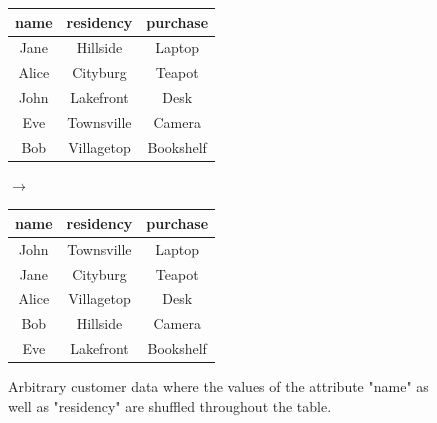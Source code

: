 \bigskip

\begin{figure}[ht]
    \begin{center}
    \footnotesize{
        \renewcommand{\arraystretch}{1.5}
        \begin{tabular}{|c|c|c|}
            \hline
            name & residency & purchase \\
            \hline
            Jane & Hillside & Laptop \\
            \hline
            Alice & Cityburg & Teapot \\
            \hline
            John & Lakefront & Desk \\
            \hline
            Eve & Townsville & Camera \\
            \hline
            Bob & Villagetop & Bookshelf \\
            \hline
        \end{tabular}
        \quad $\longrightarrow$ \quad
        \begin{tabular}{|c|c|c|}
            \hline
            \cellcolor{lightyellow} name & \cellcolor{lightyellow} residency & purchase \\
            \hline
            \cellcolor{lightyellow} John & \cellcolor{lightyellow} Townsville & Laptop \\
            \hline
            \cellcolor{lightyellow} Jane & Cityburg & Teapot \\
            \hline
            \cellcolor{lightyellow} Alice & \cellcolor{lightyellow} Villagetop & Desk \\
            \hline
            \cellcolor{lightyellow} Bob & \cellcolor{lightyellow} Hillside & Camera \\
            \hline
            \cellcolor{lightyellow} Eve & \cellcolor{lightyellow} Lakefront & Bookshelf \\
            \hline
        \end{tabular}
    }
    \end{center}
    \caption{Arbitrary customer data where the values of the attribute "name" as well as "residency" are shuffled throughout the table. \label{fig:shuffling}}
\end{figure}

